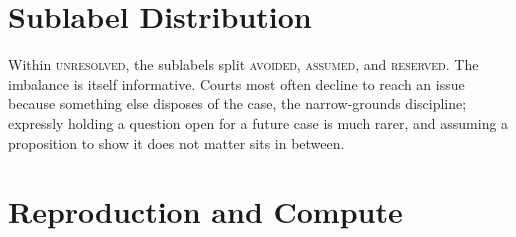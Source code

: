 \section{Sublabel Distribution}
Within \textsc{unresolved}, the sublabels split \ShareAvoided{}
\textsc{avoided}, \ShareAssumed{} \textsc{assumed}, and \ShareReserved{}
\textsc{reserved}. The imbalance is itself informative. Courts most often decline
to reach an issue because something else disposes of the case, the narrow-grounds
discipline; expressly holding a question open for a future case is much rarer,
and assuming a proposition to show it does not matter sits in between.


\section{Reproduction and Compute}
\label{app:compute}


